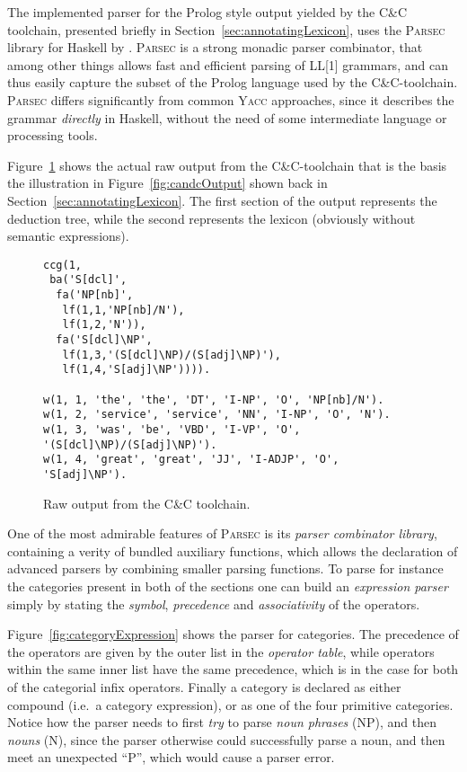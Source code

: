 The implemented parser for the Prolog style output yielded by the C\&C toolchain, presented briefly in Section~\ref{sec:annotatingLexicon}, uses the \textsc{Parsec} library for Haskell by \citeauthor{parsec} . \textsc{Parsec} is a strong monadic parser combinator, that among other things allows fast and efficient parsing of LL[1] grammars, and can thus easily capture the subset of the Prolog language used by the C\&C-toolchain. \textsc{Parsec} differs significantly from common \textsc{Yacc} approaches, since it describes the grammar \emph{directly} in Haskell, without the need of some intermediate language or processing tools.

Figure~\ref{fig:candcOutputReal} shows the actual raw output from the C\&C-toolchain that is the basis the illustration in Figure~\ref{fig:candcOutput} shown back in Section~\ref{sec:annotatingLexicon}. The first section of the output represents the deduction tree, while the second represents the lexicon (obviously without semantic expressions).

\begin{figure}[ht]
\center
\begin{cframed}{.8\textwidth}
	\scriptsize
	\begin{verbatim}
ccg(1,
 ba('S[dcl]',
  fa('NP[nb]',
   lf(1,1,'NP[nb]/N'),
   lf(1,2,'N')),
  fa('S[dcl]\NP',
   lf(1,3,'(S[dcl]\NP)/(S[adj]\NP)'),
   lf(1,4,'S[adj]\NP')))).

w(1, 1, 'the', 'the', 'DT', 'I-NP', 'O', 'NP[nb]/N').
w(1, 2, 'service', 'service', 'NN', 'I-NP', 'O', 'N').
w(1, 3, 'was', 'be', 'VBD', 'I-VP', 'O', '(S[dcl]\NP)/(S[adj]\NP)').
w(1, 4, 'great', 'great', 'JJ', 'I-ADJP', 'O', 'S[adj]\NP').
	\end{verbatim}
\end{cframed}
\vspace{1em}
	\caption{Raw output from the C\&C toolchain.}
	\label{fig:candcOutputReal}
\end{figure}

One of the most admirable features of \textsc{Parsec} is its \emph{parser combinator library}, containing a verity of bundled auxiliary functions, which allows the declaration of advanced parsers by combining smaller parsing functions. To parse for instance the categories present in both of the sections one can build an \emph{expression parser} simply by stating the \emph{symbol}, \emph{precedence} and \emph{associativity} of the operators.

Figure~\ref{fig:categoryExpression} shows the parser for categories. The precedence of the operators are given by the outer list in the \emph{operator table}, while operators within the same inner list have the same precedence, which is in the case for both of the categorial infix operators. Finally a category is declared as either compound (i.e.\ a category expression), or as one of the four primitive categories. Notice how the parser needs to first \emph{try} to parse \emph{noun phrases} (NP), and then \emph{nouns} (N), since the parser otherwise could successfully parse a noun, and then meet an unexpected ``P'', which would cause a parser error.

